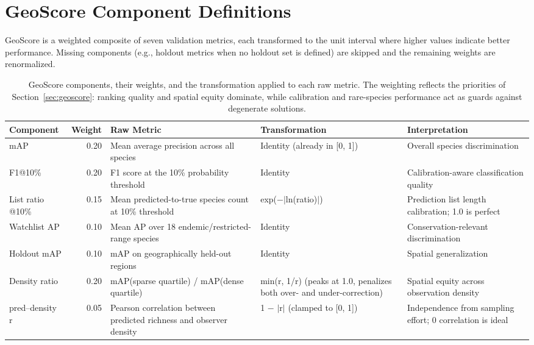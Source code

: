 \clearpage
\appendix
\renewcommand{\headeright}{Appendix}


\section{GeoScore Component Definitions}
\label{sec:A-geoscore-component-definitions}

GeoScore is a weighted composite of seven validation metrics, each transformed to the unit interval where higher values indicate better performance. Missing components (e.g., holdout metrics when no holdout set is defined) are skipped and the remaining weights are renormalized.

\begin{table}[H]
\centering
\caption{GeoScore components, their weights, and the transformation applied to each raw metric. The weighting reflects the priorities of Section~\ref{sec:geoscore}: ranking quality and spatial equity dominate, while calibration and rare-species performance act as guards against degenerate solutions.}
\label{tab:geoscore-components}
\small
\begin{tabularx}{\linewidth}{lrLLL}
\toprule
Component & Weight & Raw Metric & Transformation & Interpretation \\
\midrule
mAP & 0.20 & Mean average precision across all species & Identity (already in [0, 1]) & Overall species discrimination \\
F1@10\% & 0.20 & F1 score at the 10\% probability threshold & Identity & Calibration-aware classification quality \\
List ratio @10\% & 0.15 & Mean predicted-to-true species count at 10\% threshold & exp($-|$ln(ratio)$|$) & Prediction list length calibration; 1.0 is perfect \\
Watchlist AP & 0.10 & Mean AP over 18 endemic/restricted-range species & Identity & Conservation-relevant discrimination \\
Holdout mAP & 0.10 & mAP on geographically held-out regions & Identity & Spatial generalization \\
Density ratio & 0.20 & mAP(sparse quartile) / mAP(dense quartile) & min(r, 1/r) (peaks at 1.0, penalizes both over- and under-correction) & Spatial equity across observation density \\
pred--density r & 0.05 & Pearson correlation between predicted richness and observer density & 1 $-$ $|$r$|$ (clamped to [0, 1]) & Independence from sampling effort; 0 correlation is ideal \\
\bottomrule
\end{tabularx}
\end{table}


